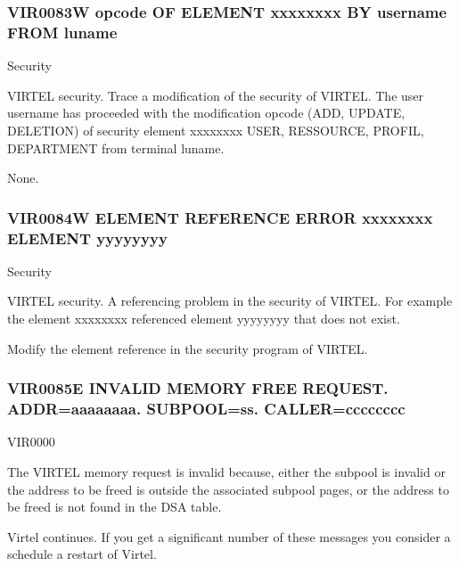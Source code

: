 \documentclass[letterpaper,10pt,english]{sphinxmanual}
\begin{document}
\subsubsection{VIR0083W opcode OF ELEMENT xxxxxxxx BY username FROM luname}
\label{\detokenize{messages:vir0083w-opcode-of-element-xxxxxxxx-by-username-from-luname}}\begin{description}
\sphinxAtStartPar
Security

\sphinxAtStartPar
VIRTEL security. Trace a modification of the security of VIRTEL. The user username has proceeded with the modification opcode (ADD, UPDATE, DELETION) of security element xxxxxxxx USER, RESSOURCE, PROFIL, DEPARTMENT from terminal luname.

\sphinxAtStartPar
None.

\end{description}


\subsubsection{VIR0084W ELEMENT REFERENCE ERROR xxxxxxxx ELEMENT yyyyyyyy}
\label{\detokenize{messages:vir0084w-element-reference-error-xxxxxxxx-element-yyyyyyyy}}\begin{description}
\sphinxAtStartPar
Security

\sphinxAtStartPar
VIRTEL security. A referencing problem in the security of VIRTEL. For example the element xxxxxxxx referenced element yyyyyyyy that does not exist.

\sphinxAtStartPar
Modify the element reference in the security program of VIRTEL.

\end{description}


\subsubsection{VIR0085E INVALID MEMORY FREE REQUEST. ADDR=aaaaaaaa. SUBPOOL=ss. CALLER=cccccccc}
\label{\detokenize{messages:vir0085e-invalid-memory-free-request-addr-aaaaaaaa-subpool-ss-caller-cccccccc}}\begin{description}
\sphinxAtStartPar
VIR0000

\sphinxAtStartPar
The VIRTEL memory request is invalid because, either the subpool is invalid or the address to be freed is outside the associated subpool pages, or the address to be freed is not found in the DSA table.

\sphinxAtStartPar
Virtel continues. If you get a significant number of these messages you consider a schedule a restart of Virtel.

\end{description}
\end{document}
